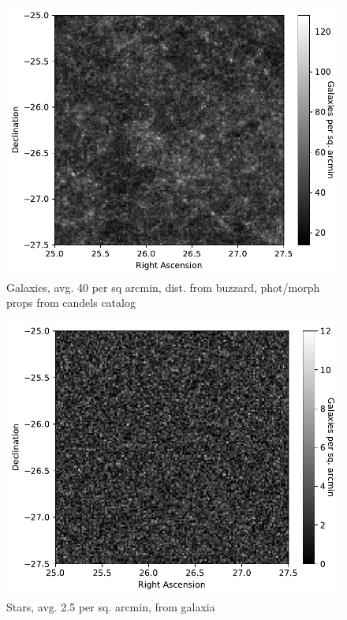 \documentclass[aps,prd, amsmath,amssymb,superscriptaddress,showkeys,nofootinbib,reprint,preprintnumbers]{revtex4-1}
\begin{document}
\begin{figure}
\begin{center}
\includegraphics[width=\columnwidth]{figures/galaxies.pdf}
\end{center}
\caption[]{
Galaxies, avg. 40 per sq arcmin, dist. from buzzard, phot/morph props from candels catalog
\label{fig:galaxies}}
\end{figure}

\begin{figure}
\begin{center}
\includegraphics[width=\columnwidth]{figures/stars.pdf}
\end{center}
\caption[]{
Stars, avg. 2.5 per sq. arcmin, from galaxia
\label{fig:stars}}
\end{figure}
\end{document}

